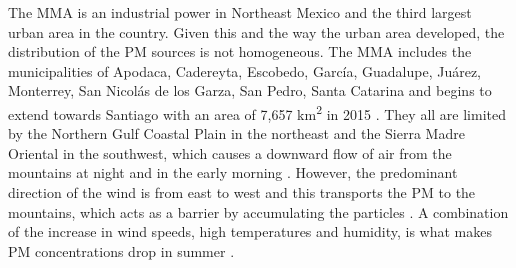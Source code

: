 The MMA is an industrial power in Northeast Mexico and the third largest urban area in the country. Given this and the way the urban area developed, the distribution of the PM sources is not homogeneous. The MMA includes the municipalities of Apodaca, Cadereyta, Escobedo, García, Guadalupe, Juárez, Monterrey, San Nicolás de los Garza, San Pedro, Santa Catarina and begins to extend towards Santiago with an area of 7,657 km\textsuperscript{2} in 2015 \cite{inegi2015}. They all are limited by the Northern Gulf Coastal Plain in the northeast and the Sierra Madre Oriental in the southwest, which causes a downward flow of air from the mountains at night and in the early morning \cite{molina2019}. However, the predominant direction of the wind is from east to west and this transports the PM to the mountains, which acts as a barrier by accumulating the particles \cite{gonzalez2011}. A combination of the increase in wind speeds, high temperatures and humidity, is what makes PM concentrations drop in summer \cite{gonzalez2011,sima2019}.
